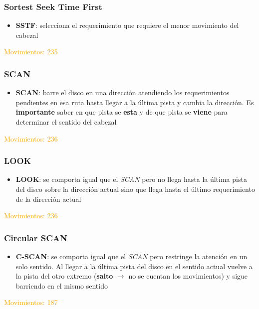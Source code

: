 \begin{frame}
  \frametitle{\textbf{Sortest Seek Time First}}
  \begin{itemize}
    \item \textbf{SSTF}: selecciona el requerimiento que requiere el menor movimiento del cabezal
  \end{itemize}
  \hspace{35pt} \textcolor{orange}{Movimientos: 235}
\end{frame}

\begin{frame}
  \frametitle{\textbf{SCAN}}
  \begin{itemize}
    \item \textbf{SCAN}: barre el disco en una dirección atendiendo los requerimientos pendientes en esa ruta hasta llegar a la última pista y cambia la dirección. Es \textbf{importante} saber en que pista se \textbf{esta} y de que pista se \textbf{viene} para determinar el sentido del cabezal
  \end{itemize}
  \hspace{35pt} \textcolor{orange}{Movimientos: 236}
\end{frame}

\begin{frame}
  \frametitle{\textbf{LOOK}}
  \begin{itemize}
    \item \textbf{LOOK}: se comporta igual que el \textit{SCAN} pero no llega hasta la última pista del disco sobre la dirección actual sino que llega hasta el último requerimiento de la dirección actual
  \end{itemize}
  \hspace{35pt} \textcolor{orange}{Movimientos: 236}
\end{frame}

\begin{frame}
  \frametitle{\textbf{Circular SCAN}}
  \begin{itemize}
    \item \textbf{C-SCAN}: se comporta igual que el \textit{SCAN} pero restringe la atención en un solo sentido. Al llegar a la última pista del disco en el sentido actual vuelve a la pista del otro extremo (\textbf{salto} $\rightarrow$ no se cuentan los movimientos) y sigue barriendo en el mismo sentido
  \end{itemize}
  \hspace{35pt} \textcolor{orange}{Movimientos: 187}
\end{frame}

